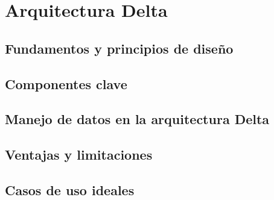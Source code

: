 \section{Arquitectura Delta}
\subsection{Fundamentos y principios de diseño}
\subsection{Componentes clave}
\subsection{Manejo de datos en la arquitectura Delta}
\subsection{Ventajas y limitaciones}
\subsection{Casos de uso ideales}